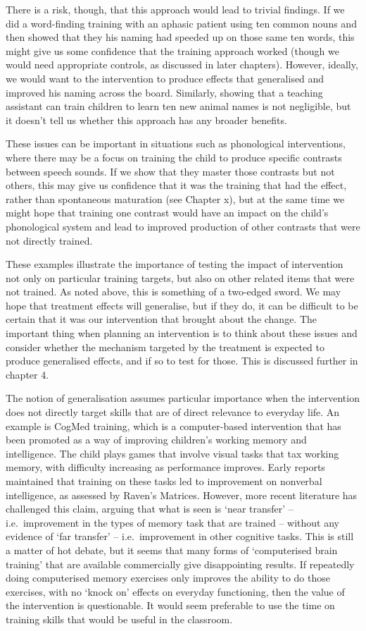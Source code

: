 \documentclass[]{book}
\begin{document}
There is a risk, though, that this approach would lead to trivial findings. If we did a word-finding training with an aphasic patient using ten common nouns and then showed that they his naming had speeded up on those same ten words, this might give us some confidence that the training approach worked (though we would need appropriate controls, as discussed in later chapters). However, ideally, we would want to the intervention to produce effects that generalised and improved his naming across the board. Similarly, showing that a teaching assistant can train children to learn ten new animal names is not negligible, but it doesn't tell us whether this approach has any broader benefits.

These issues can be important in situations such as phonological interventions, where there may be a focus on training the child to produce specific contrasts between speech sounds. If we show that they master those contrasts but not others, this may give us confidence that it was the training that had the effect, rather than spontaneous maturation (see Chapter x), but at the same time we might hope that training one contrast would have an impact on the child's phonological system and lead to improved production of other contrasts that were not directly trained.

These examples illustrate the importance of testing the impact of intervention not only on particular training targets, but also on other related items that were not trained. As noted above, this is something of a two-edged sword. We may hope that treatment effects will generalise, but if they do, it can be difficult to be certain that it was our intervention that brought about the change. The important thing when planning an intervention is to think about these issues and consider whether the mechanism targeted by the treatment is expected to produce generalised effects, and if so to test for those. This is discussed further in chapter 4.

The notion of generalisation assumes particular importance when the intervention does not directly target skills that are of direct relevance to everyday life. An example is CogMed training, which is a computer-based intervention that has been promoted as a way of improving children's working memory and intelligence. The child plays games that involve visual tasks that tax working memory, with difficulty increasing as performance improves. Early reports maintained that training on these tasks led to improvement on nonverbal intelligence, as assessed by Raven's Matrices. However, more recent literature has challenged this claim, arguing that what is seen is `near transfer' -- i.e.~improvement in the types of memory task that are trained -- without any evidence of `far transfer' -- i.e.~improvement in other cognitive tasks. This is still a matter of hot debate, but it seems that many forms of `computerised brain training' that are available commercially give disappointing results. If repeatedly doing computerised memory exercises only improves the ability to do those exercises, with no `knock on' effects on everyday functioning, then the value of the intervention is questionable. It would seem preferable to use the time on training skills that would be useful in the classroom.
\end{document}
